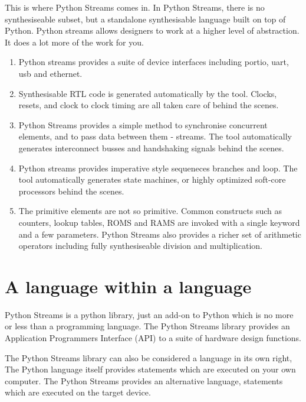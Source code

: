 This is where Python Streams comes in. In Python Streams, there is no
synthesiseable subset, but a standalone synthesisable language built on top of
Python. Python streams allows designers to work at a higher level of
abstraction. It does a lot more of the work for you.

\begin{enumerate}

\item Python streams provides a suite of device interfaces including portio,
uart, usb and ethernet.

\item Synthesisable RTL code is generated automatically by the tool. Clocks,
resets, and clock to clock timing are all taken care of behind the scenes.

\item Python Streams provides a simple method to synchronise concurrent
elements, and to pass data between them - streams. The tool automatically
generates interconnect busses and handshaking signals behind the scenes.

\item Python streams provides imperative style sequeneces branches and loop. The
tool automatically generates state machines, or highly optimized soft-core
processors behind the scenes.

\item The primitive elements are not so primitive. Common constructs such as
counters, lookup tables, ROMS and RAMS are invoked with a single keyword and a
few parameters. Python Streams also provides a richer set of arithmetic
operators including fully synthesiseable division and multiplication.

\end{enumerate}

\section{A language within a language}

Python Streams is a python library, just an add-on to Python which is no more
or less than a programming language. The Python Streams library provides an
Application Programmers Interface (API) to a suite of hardware design functions.

The Python Streams library can also be considered a language in its own right,
The Python language itself provides statements which are executed on your
own computer. The Python Streams provides an alternative language, statements
which are executed on the target device.
